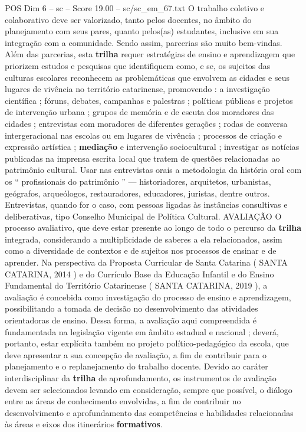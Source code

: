 \begin{textsample}{POS Dim 6 – sc – Score 19.00 – sc/sc\_em\_67.txt}
O trabalho coletivo e colaborativo deve ser valorizado, tanto pelos docentes, no âmbito do planejamento com seus pares, quanto pelos(as) estudantes, inclusive em sua integração com a comunidade.
Sendo assim, parcerias são muito bem-vindas.
Além das parcerias, esta \textbf{trilha} requer estratégias de ensino e aprendizagem que priorizem estudos e pesquisas que identifiquem como, e se, os sujeitos das culturas escolares reconhecem as problemáticas que envolvem as cidades e seus lugares de vivência no território catarinense, promovendo : a investigação científica ; fóruns, debates, campanhas e palestras ; políticas públicas e projetos de intervenção urbana ; grupos de memória e de escuta dos moradores das cidades ; entrevistas com moradores de diferentes gerações ; rodas de conversa intergeracional nas escolas ou em lugares de vivência ; processos de criação e expressão artística ; \textbf{mediação} e intervenção sociocultural ; investigar as notícias publicadas na imprensa escrita local que tratem de questões relacionadas ao patrimônio cultural.
Usar nas entrevistas orais a metodologia da história oral com os “ profissionais do patrimônio ” — historiadores, arquitetos, urbanistas, geógrafos, arqueólogos, restauradores, educadores, juristas, dentre outros.
Entrevistas, quando for o caso, com pessoas ligadas às instâncias consultivas e deliberativas, tipo Conselho Municipal de Política Cultural.
AVALIAÇÃO O processo avaliativo, que deve estar presente ao longo de todo o percurso da \textbf{trilha} integrada, considerando a multiplicidade de saberes a ela relacionados, assim como a diversidade de contextos e de sujeitos nos processos de ensinar e de aprender.
Na perspectiva da Proposta Curricular de Santa Catarina ( SANTA CATARINA, 2014 ) e do Currículo Base da Educação Infantil e do Ensino Fundamental do Território Catarinense ( SANTA CATARINA, 2019 ), a avaliação é concebida como investigação do processo de ensino e aprendizagem, possibilitando a tomada de decisão no desenvolvimento das atividades orientadoras de ensino.
Dessa forma, a avaliação aqui compreendida é fundamentada na legislação vigente em âmbito estadual e nacional ; deverá, portanto, estar explícita também no projeto político-pedagógico da escola, que deve apresentar a sua concepção de avaliação, a fim de contribuir para o planejamento e o replanejamento do trabalho docente.
Devido ao caráter interdisciplinar da \textbf{trilha} de aprofundamento, os instrumentos de avaliação devem ser selecionados levando em consideração, sempre que possível, o diálogo entre as áreas de conhecimento envolvidas, a fim de contribuir no desenvolvimento e aprofundamento das competências e habilidades relacionadas às áreas e eixos dos itinerários \textbf{formativos}.

\end{textsample}
